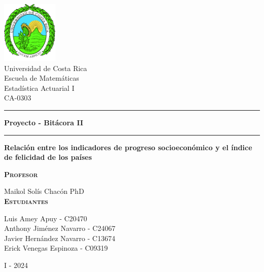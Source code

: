 \begin{titlepage}
\begin{center}
\vspace{2cm}
\includegraphics[width=0.2\textwidth]{root/Logo_ucr.png}~\\[1cm]

{\huge Universidad de Costa Rica} \\
{\large 
Escuela de Matemáticas \\
Estadística Actuarial I \\
CA-0303\\
}

\vspace{.5cm}


\hrule
\vspace{.5cm}
{ \Huge \bfseries Proyecto - Bitácora II} 
\vspace{.5cm}
\hrule
\vspace{1cm}

{\Large \textbf{Relación entre los indicadores de progreso socioeconómico y el índice de felicidad de los países}}
\vspace{1cm}

\textsc{\textbf{Profesor}}\\
\vspace{2px}

Maikol Solís Chacón PhD \\

\vspace{.5cm}
\textsc{\textbf{Estudiantes}}\\
\vspace{2px}


Luis Amey Apuy - C20470\\
\vspace{5px}
Anthony Jiménez Navarro - C24067\\
\vspace{5px}
Javier Hernández Navarro - C13674\\
\vspace{5px}
Erick Venegas Espinoza - C09319\\

\vspace{1cm}

I - 2024 \\


\end{center}
\end{titlepage}
